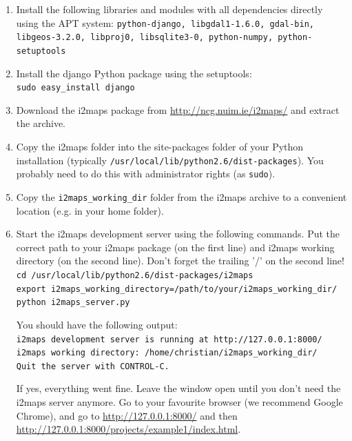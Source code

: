 \documentclass[11pt]{article}
\begin{document}
\begin{enumerate}

	\item Install the following libraries and modules with all dependencies directly using the APT system: \texttt{python-django, libgdal1-1.6.0, gdal-bin, libgeos-3.2.0, libproj0, libsqlite3-0, python-numpy, python-setuptools}

	\item Install the django Python package using the setuptools: \\
	\texttt{sudo easy\_install django}

	\item Download the i2maps package from \url{http://ncg.nuim.ie/i2maps/} and extract the archive.

	\item Copy the i2maps folder into the site-packages folder of your Python installation (typically \texttt{/usr/local/lib/python2.6/dist-packages}). You probably need to do this with administrator rights (as \texttt{sudo}).

	\item Copy the \verb=i2maps_working_dir= folder from the i2maps archive to a convenient location (e.g. in your home folder).

	\item Start the i2maps development server using the following commands. Put the correct path to your i2maps package (on the first line) and i2maps working directory (on the second line). Don't forget the trailing '/' on the second line! \\
	\texttt{cd /usr/local/lib/python2.6/dist-packages/i2maps \\
	export i2maps\_working\_directory=/path/to/your/i2maps\_working\_dir/ \\
	python i2maps\_server.py}
	
	You should have the following output: \\
	\texttt{i2maps development server is running at http://127.0.0.1:8000/ \\
	i2maps working directory: /home/christian/i2maps\_working\_dir/ \\
	Quit the server with CONTROL-C.}
	
	If yes, everything went fine. Leave the window open until you don't need the i2maps server anymore. Go to your favourite browser (we recommend Google Chrome), and go to \url{http://127.0.0.1:8000/} and then \url{http://127.0.0.1:8000/projects/example1/index.html}.
	
\end{enumerate}
\end{document}
